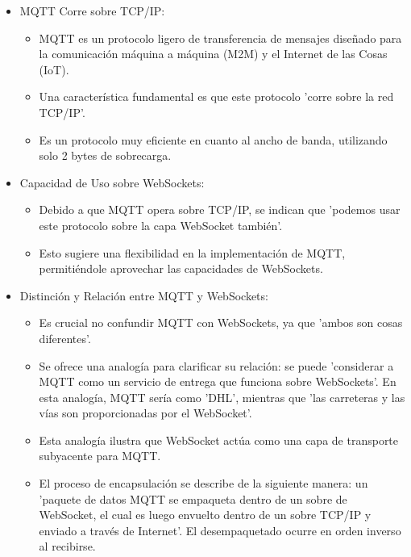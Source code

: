 \documentclass{report}
\begin{document}
\begin{itemize}
    \item MQTT Corre sobre TCP/IP:
        \begin{itemize}
            \item MQTT es un protocolo ligero de transferencia de mensajes diseñado para la comunicación máquina a máquina (M2M) y 
            el Internet de las Cosas (IoT).
            \item Una característica fundamental es que este protocolo 'corre sobre la red TCP/IP'.
            \item Es un protocolo muy eficiente en cuanto al ancho de banda, utilizando solo 2 bytes de sobrecarga.
        \end{itemize}

    \item Capacidad de Uso sobre WebSockets:
        \begin{itemize}
            \item Debido a que MQTT opera sobre TCP/IP, se  indican que 'podemos usar este protocolo sobre la capa WebSocket también'.
            \item Esto sugiere una flexibilidad en la implementación de MQTT, permitiéndole aprovechar las capacidades de WebSockets.
        \end{itemize}

    \item Distinción y Relación entre MQTT y WebSockets:
        \begin{itemize}
            \item Es crucial no confundir MQTT con WebSockets, ya que 'ambos son cosas diferentes'.
            \item Se ofrece una analogía para clarificar su relación: se puede 'considerar a MQTT como un servicio de entrega 
            que funciona sobre WebSockets'. En esta analogía, MQTT sería como 'DHL', mientras que 'las carreteras y las vías son 
            proporcionadas por el WebSocket'.
            \item Esta analogía ilustra que WebSocket actúa como una capa de transporte subyacente para MQTT.
            \item El proceso de encapsulación se describe de la siguiente manera: un 'paquete de datos MQTT se empaqueta dentro de 
            un sobre de WebSocket, el cual es luego envuelto dentro de un sobre TCP/IP y enviado a través de Internet'. 
            El desempaquetado ocurre en orden inverso al recibirse.
        \end{itemize}


\end{itemize}
\end{document}
